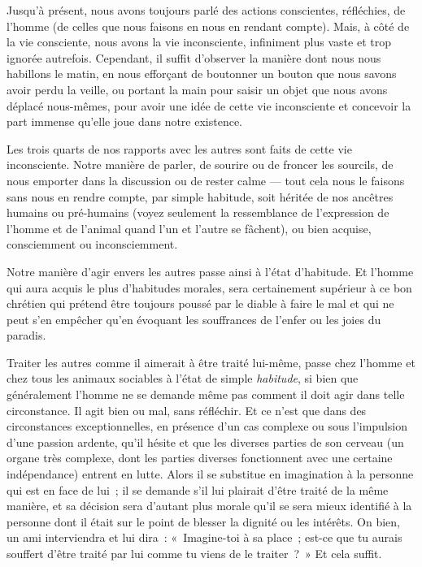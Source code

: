 \documentclass[french,twoside]{book} %
\begin{document}
\noindent Jusqu’à présent, nous avons toujours parlé des actions conscientes, réfléchies, de l’homme (de celles que nous faisons en nous en rendant compte). Mais, à côté de la vie consciente, nous avons la vie inconsciente, infiniment plus vaste et trop ignorée autrefois. Cependant, il suffit d’observer la manière dont nous nous habillons le matin, en nous efforçant de boutonner un bouton que nous savons avoir perdu la veille, ou portant la main pour saisir un objet que nous avons déplacé nous-mêmes, pour avoir une idée de cette vie inconsciente et concevoir la part immense qu’elle joue dans notre existence.\par
Les trois quarts de nos rapports avec les autres sont faits de cette vie inconsciente. Notre manière de parler, de sourire ou de froncer les sourcils, de nous emporter dans la discussion ou de rester calme — tout cela nous le faisons sans nous en rendre compte, par simple habitude, soit héritée de nos ancêtres humains ou pré-humains (voyez seulement la ressemblance de l’expression de l’homme et de l’animal quand l’un et l’autre se fâchent), ou bien acquise, consciemment ou inconsciemment.\par
Notre manière d’agir envers les autres passe ainsi à l’état d’habitude. Et l’homme qui aura acquis le plus d’habitudes morales, sera certainement supérieur à ce bon chrétien qui prétend être toujours poussé par le diable à faire le mal et qui ne peut s’en empêcher qu’en évoquant les souffrances de l’enfer ou les joies du paradis.\par
Traiter les autres comme il aimerait à être traité lui-même, passe  chez l’homme et chez tous les animaux sociables à l’état de simple \emph{habitude}, si bien que généralement l’homme ne se demande même pas comment il doit agir dans telle circonstance. Il agit bien ou mal, sans réfléchir. Et ce n’est que dans des circonstances exceptionnelles, en présence d’un cas complexe ou sous l’impulsion d’une passion ardente, qu’il hésite et que les diverses parties de son cerveau (un organe très complexe, dont les parties diverses fonctionnent avec une certaine indépendance) entrent en lutte. Alors il se substitue en imagination à la personne qui est en face de lui ; il se demande s’il lui plairait d’être traité de la même manière, et sa décision sera d’autant plus morale qu’il se sera mieux identifié à la personne dont il était sur le point de blesser la dignité ou les intérêts. On bien, un ami interviendra et lui dira : « Imagine-toi à sa place ; est-ce que tu aurais souffert d’être traité par lui comme tu viens de le traiter ? » Et cela suffit.\par
\end{document}
